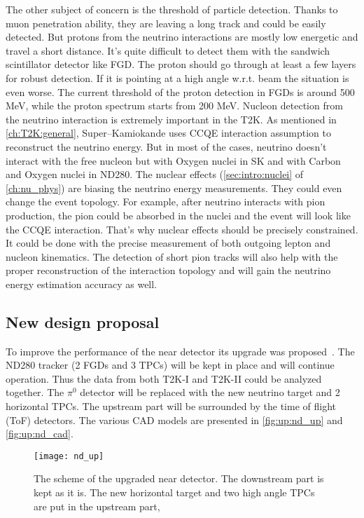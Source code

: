 \documentclass[../main.tex]{subfiles}
\begin{document}
The other subject of concern is the threshold of particle detection. Thanks to muon penetration ability, they are leaving a long track and could be easily detected. But protons from the neutrino interactions are mostly low energetic and travel a short distance. It's quite difficult to detect them with the sandwich scintillator detector like FGD. The proton should go through at least a few layers for robust detection. If it is pointing at a high angle w.r.t. beam the situation is even worse. The current threshold of the proton detection in FGDs is around 500 MeV, while the proton spectrum starts from 200 MeV. Nucleon detection from the neutrino interaction is extremely important in the T2K. As mentioned in \autoref{ch:T2K:general}, Super--Kamiokande uses CCQE interaction assumption to reconstruct the neutrino energy. But in most of the cases, neutrino doesn't interact with the free nucleon but with Oxygen nuclei in SK and with Carbon and Oxygen nuclei in ND280. The nuclear effects (\autoref{sec:intro:nuclei} of \autoref{ch:nu_phys}) are biasing the neutrino energy measurements. They could even change the event topology. For example, after neutrino interacts with pion production, the pion could be absorbed in the nuclei and the event will look like the CCQE interaction. That's why nuclear effects should be precisely constrained. It could be done with the precise measurement of both outgoing lepton and nucleon kinematics. The detection of short pion tracks will also help with the proper reconstruction of the interaction topology and will gain the neutrino energy estimation accuracy as well.

\subsection{New design proposal}

To improve the performance of the near detector its upgrade was proposed~\cite{Abe2019}. The ND280 tracker (2 FGDs and 3 TPCs) will be kept in place and will continue operation. Thus the data from both T2K-I and T2K-II could be analyzed together. The $\pi^0$ detector will be replaced with the new neutrino target and 2 horizontal TPCs. The upstream part will be surrounded by the time of flight (ToF) detectors. The various CAD models are presented in \autoref{fig:up:nd_up} and \autoref{fig:up:nd_cad}.

\begin{figure}[!ht]
  \centering
  \texttt{[image: nd\_up]}
  \caption{The scheme of the upgraded near detector. The downstream part is kept as it is. The new horizontal target and two high angle TPCs are put in the upstream part,}
  \label{fig:up:nd_up}
\end{figure}
\end{document}
